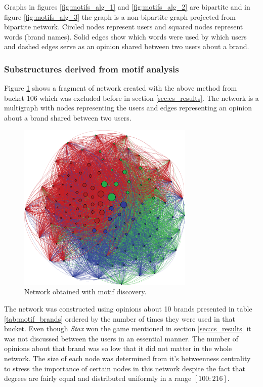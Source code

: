       Graphs in figures \ref{fig:motifs_alg_1} and \ref{fig:motifs_alg_2} are bipartite and in figure \ref{fig:motifs_alg_3} the graph is a non-bipartite graph projected from bipartite network. Circled nodes represent users and squared nodes represent words (brand names). Solid edges show which words were used by which users and dashed edges serve as an opinion shared between two users about a brand.
      
    \subsubsection{Substructures derived from motif analysis}
      
      Figure \ref{fig:motif_network} shows a fragment of network created with the above method from bucket 106 which was excluded before in section \ref{sec:cs_results}. The network is a multigraph with nodes representing the users and edges representing an opinion about a brand shared between two users.
      \begin{figure}[t!]
        \centering
        \includegraphics[width=0.75\textwidth]{chapters/03_implementation/motif_network}
        \caption{Network obtained with motif discovery.}
        \label{fig:motif_network}
      \end{figure}
      
      The network was constructed using opinions about 10 brands presented in table \ref{tab:motif_brands} ordered by the number of times they were used in that bucket. Even though \emph{Stax} won the game mentioned in section \ref{sec:cs_results} it was not discussed between the users in an essential manner. The number of opinions about that brand was so low that it did not matter in the whole network. The size of each node was determined from it's betweenness centrality to stress the importance of certain nodes in this network despite the fact that degrees are fairly equal and distributed uniformly in a range $[100:216]$.
      

